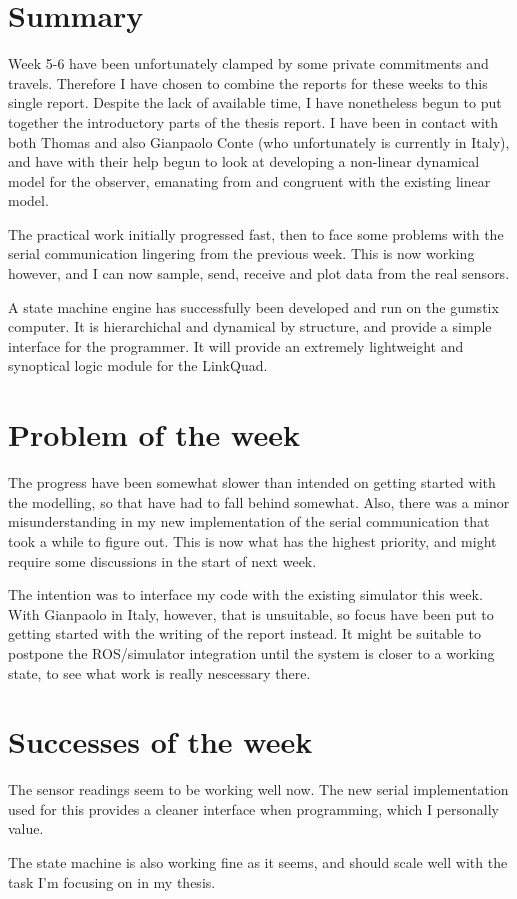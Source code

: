 \section{Summary}
Week 5-6 have been unfortunately clamped by some private commitments and
travels. Therefore I have chosen to combine the reports for these weeks
to this single report.
Despite the lack of available time, I have nonetheless begun to put together the introductory
parts of the thesis report. I have been in contact with both Thomas and
also Gianpaolo Conte (who unfortunately is currently in Italy),
and have with their help begun to look at developing a non-linear dynamical model
for the observer, emanating from and congruent with the existing linear model.

The practical work initially progressed fast, then to face some problems
with the serial communication lingering from the previous week.
This is now working however, and I can now sample, send, receive and plot
data from the real sensors.

A state machine engine has successfully been developed and run on the gumstix
computer. It is hierarchichal and dynamical by structure, and provide a simple
interface for the programmer. It will provide an extremely lightweight and
synoptical logic module for the LinkQuad.

\section{Problem of the week}
The progress have been somewhat slower than intended on getting started
with the modelling, so that have had to fall behind somewhat.
Also, there was a minor misunderstanding in my new implementation of the
serial communication that took a while to figure out.
This is now what has the highest priority, and might require some discussions
in the start of next week.

The intention was to interface my code with the existing simulator this week.
With Gianpaolo in Italy, however, that is unsuitable, so focus have been
put to getting started with the writing of the report instead.
It might be suitable to postpone the ROS/simulator integration until the
system is closer to a working state, to see what work is really nescessary there.

\section{Successes of the week}
The sensor readings seem to be working well now. The new serial implementation
used for this provides a cleaner interface when programming, which I personally value.

The state machine is also working fine as it seems, and should scale
well with the task I'm focusing on in my thesis.

